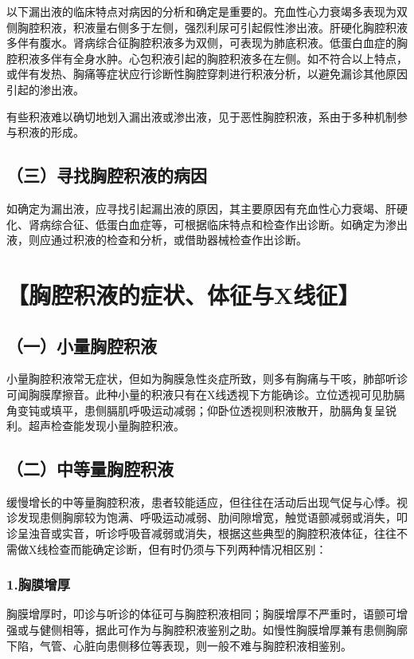 以下漏出液的临床特点对病因的分析和确定是重要的。充血性心力衰竭多表现为双侧胸腔积液，积液量右侧多于左侧，强烈利尿可引起假性渗出液。肝硬化胸腔积液多伴有腹水。肾病综合征胸腔积液多为双侧，可表现为肺底积液。低蛋白血症的胸腔积液多伴有全身水肿。心包积液引起的胸腔积液多在左侧。如不符合以上特点，或伴有发热、胸痛等症状应行诊断性胸腔穿刺进行积液分析，以避免漏诊其他原因引起的渗出液。

有些积液难以确切地划入漏出液或渗出液，见于恶性胸腔积液，系由于多种机制参与积液的形成。

\subsection{（三）寻找胸腔积液的病因}

如确定为漏出液，应寻找引起漏出液的原因，其主要原因有充血性心力衰竭、肝硬化、肾病综合征、低蛋白血症等，可根据临床特点和检查作出诊断。如确定为渗出液，则应通过积液的检查和分析，或借助器械检查作出诊断。

\section{【胸腔积液的症状、体征与X线征】}

\subsection{（一）小量胸腔积液}

小量胸腔积液常无症状，但如为胸膜急性炎症所致，则多有胸痛与干咳，肺部听诊可闻胸膜摩擦音。此种小量的积液只有在X线透视下方能确诊。立位透视可见肋膈角变钝或填平，患侧膈肌呼吸运动减弱；仰卧位透视则积液散开，肋膈角复呈锐利。超声检查能发现小量胸腔积液。

\subsection{（二）中等量胸腔积液}

缓慢增长的中等量胸腔积液，患者较能适应，但往往在活动后出现气促与心悸。视诊发现患侧胸廓较为饱满、呼吸运动减弱、肋间隙增宽，触觉语颤减弱或消失，叩诊呈浊音或实音，听诊呼吸音减弱或消失，根据这些典型的胸腔积液体征，往往不需做X线检查而能确定诊断，但有时仍须与下列两种情况相区别：

\subsubsection{1.胸膜增厚}

胸膜增厚时，叩诊与听诊的体征可与胸腔积液相同；胸膜增厚不严重时，语颤可增强或与健侧相等，据此可作为与胸腔积液鉴别之助。如慢性胸膜增厚兼有患侧胸廓下陷，气管、心脏向患侧移位等表现，则一般不难与胸腔积液相鉴别。


